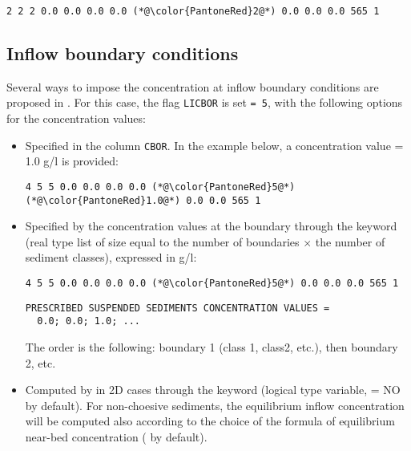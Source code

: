 \begin{lstlisting}[frame=trBL]
2 2 2 0.0 0.0 0.0 0.0 (*@\color{PantoneRed}2@*) 0.0 0.0 0.0 565 1
\end{lstlisting}

\subsection{Inflow boundary conditions}
Several ways to impose the concentration at inflow boundary conditions are proposed in \gaia. For this case, the flag \texttt{LICBOR} is set \texttt{= 5}, with the following options for the concentration values:
\begin{itemize}
\item Specified in the column \texttt{CBOR}. In the example below, a concentration value {\ttfamily = 1.0} g/l is provided:
\begin{lstlisting}[frame=trBL]
4 5 5 0.0 0.0 0.0 0.0 (*@\color{PantoneRed}5@*) (*@\color{PantoneRed}1.0@*) 0.0 0.0 565 1
\end{lstlisting}
\item Specified by the concentration values at the boundary through the keyword  (real type list of size equal to the number of boundaries $\times$ the number of sediment classes), expressed in g/l:
\begin{lstlisting}[frame=trBL]
4 5 5 0.0 0.0 0.0 0.0 (*@\color{PantoneRed}5@*) 0.0 0.0 0.0 565 1
\end{lstlisting}
\begin{lstlisting}[frame=trBL]
  PRESCRIBED SUSPENDED SEDIMENTS CONCENTRATION VALUES =
  0.0; 0.0; 1.0; ...
\end{lstlisting}
The order is the following: boundary 1 (class 1, class2, etc.), then boundary 2, etc.
\item Computed by \gaia{} in 2D cases through the keyword  (logical type variable, {\ttfamily = NO} by default).
For non-choesive sediments, the equilibrium inflow concentration will be computed also according to the choice of the formula of equilibrium near-bed concentration ( by default).


\end{itemize}
